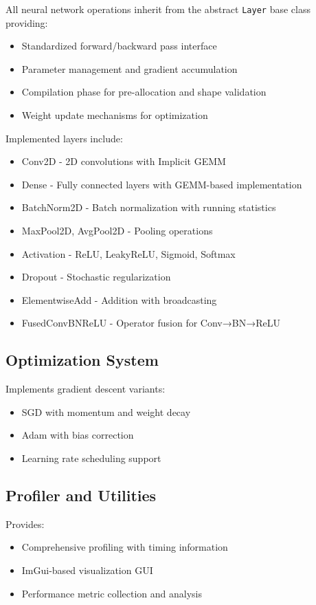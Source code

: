\documentclass[12pt,oneside,a4paper]{report}
\begin{document}
All neural network operations inherit from the abstract \texttt{Layer} base class providing:
\begin{itemize}
    \item Standardized forward/backward pass interface
    \item Parameter management and gradient accumulation
    \item Compilation phase for pre-allocation and shape validation
    \item Weight update mechanisms for optimization
\end{itemize}

Implemented layers include:
\begin{itemize}
    \item Conv2D - 2D convolutions with Implicit GEMM
    \item Dense - Fully connected layers with GEMM-based implementation
    \item BatchNorm2D - Batch normalization with running statistics
    \item MaxPool2D, AvgPool2D - Pooling operations
    \item Activation - ReLU, LeakyReLU, Sigmoid, Softmax
    \item Dropout - Stochastic regularization
    \item ElementwiseAdd - Addition with broadcasting
    \item FusedConvBNReLU - Operator fusion for Conv→BN→ReLU
\end{itemize}

\subsection{Optimization System}

Implements gradient descent variants:
\begin{itemize}
    \item SGD with momentum and weight decay
    \item Adam with bias correction
    \item Learning rate scheduling support
\end{itemize}

\subsection{Profiler and Utilities}

Provides:
\begin{itemize}
    \item Comprehensive profiling with timing information
    \item ImGui-based visualization GUI
    \item Performance metric collection and analysis
\end{itemize}
\end{document}
